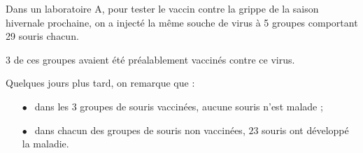 \documentclass[10pt]{article}
\begin{document}
\setlength\parindent{0mm}
\pagestyle{fancy}
\thispagestyle{empty}
    
    
    




\medskip

Dans un laboratoire A, pour tester le vaccin contre la grippe de la saison hivernale prochaine, on a injecté la même souche de virus à  5 groupes comportant 29 souris chacun.

3 de ces groupes avaient été préalablement vaccinés contre ce virus.

Quelques jours plus tard, on remarque que :

\setlength\parindent{10mm}
\begin{itemize}
\item[$\bullet~~$] dans les $3$ groupes de souris vaccinées, aucune souris n'est malade ;
\item[$\bullet~~$] dans chacun des groupes de souris non vaccinées, $23$ souris ont développé la maladie.
\end{itemize}
\setlength\parindent{0mm} 

\medskip
 
\end{document}
